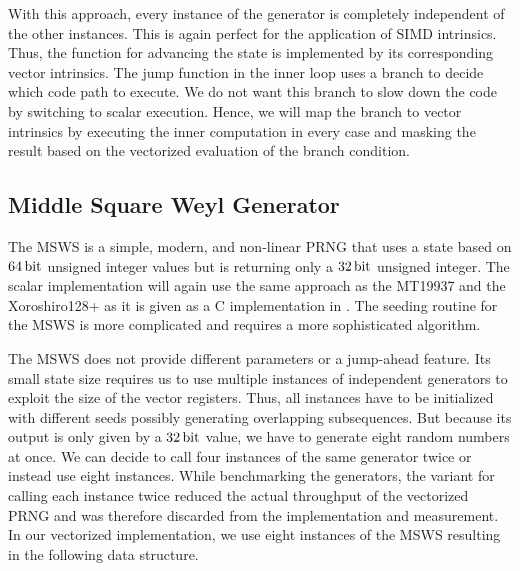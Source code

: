 \documentclass{stdlocal}
\begin{document}

    With this approach, every instance of the generator is completely independent of the other instances.
    This is again perfect for the application of SIMD intrinsics.
    Thus, the function for advancing the state is implemented by its corresponding vector intrinsics.
    The jump function in the inner loop uses a branch to decide which code path to execute.
    We do not want this branch to slow down the code by switching to scalar execution.
    Hence, we will map the branch to vector intrinsics by executing the inner computation in every case and masking the result based on the vectorized evaluation of the branch condition.



  \subsection{Middle Square Weyl Generator} %
  \label{sub:middle_square_weyl_generator}
    The MSWS is a simple, modern, and non-linear PRNG that uses a state based on $64\, \mathrm{bit}$ unsigned integer values but is returning only a $32\, \mathrm{bit}$ unsigned integer.
    The scalar implementation will again use the same approach as the MT19937 and the Xoroshiro128+ as it is given as a C implementation in \textcite{widynski2019}.
    The seeding routine for the MSWS is more complicated and requires a more sophisticated algorithm.

    The MSWS does not provide different parameters or a jump-ahead feature.
    Its small state size requires us to use multiple instances of independent generators to exploit the size of the vector registers.
    Thus, all instances have to be initialized with different seeds possibly generating overlapping subsequences.
    But because its output is only given by a $32\, \mathrm{bit}$ value, we have to generate eight random numbers at once.
    We can decide to call four instances of the same generator twice or instead use eight instances.
    While benchmarking the generators, the variant for calling each instance twice reduced the actual throughput of the vectorized PRNG and was therefore discarded from the implementation and measurement.
    In our vectorized implementation, we use eight instances of the MSWS resulting in the following data structure.
\end{document}
